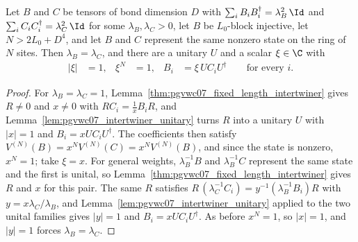 \begin{lemma}
    \label{lem:pgvwc07_ti_uniqueness_single_block}
    \leanok
    Let $B$ and $C$ be tensors of bond dimension $D$ with
    $\sum_iB_iB_i^\dagger=\lambda_B^2\,\Id$ and
    $\sum_iC_iC_i^\dagger=\lambda_C^2\,\Id$ for some $\lambda_B,\lambda_C>0$,
    let $B$ be $L_0$-block injective, let $N>2L_0+D^4$, and let $B$ and $C$
    represent the same nonzero state on the ring of $N$ sites. Then
    $\lambda_B=\lambda_C$, and there are a unitary $U$ and a scalar
    $\xi\in\C$ with
    \begin{align}
        |\xi| & =1, & \xi^N & =1, & B_i & =\xi\,UC_iU^\dagger
        \qquad\text{for every }i.
        \label{eq:pgvwc07_ti_uniqueness_conclusion}
    \end{align}
\end{lemma}

\begin{proof}
    \leanok
    For $\lambda_B=\lambda_C=1$,
    Lemma~\ref{thm:pgvwc07_fixed_length_intertwiner} gives $R\neq0$ and
    $x\neq0$ with $RC_i=\tfrac1xB_iR$, and
    Lemma~\ref{lem:pgvwc07_intertwiner_unitary} turns $R$ into a unitary $U$
    with $|x|=1$ and $B_i=xUC_iU^\dagger$. The coefficients then satisfy
    $V^{(N)}(B)=x^NV^{(N)}(C)=x^NV^{(N)}(B)$, and since the state is nonzero,
    $x^N=1$; take $\xi=x$. For general weights, $\lambda_B^{-1}B$ and
    $\lambda_B^{-1}C$ represent the same state and the first is unital, so
    Lemma~\ref{thm:pgvwc07_fixed_length_intertwiner} gives $R$ and $x$ for
    this pair. The same $R$ satisfies
    $R\,(\lambda_C^{-1}C_i)=y^{-1}(\lambda_B^{-1}B_i)R$ with
    $y=x\lambda_C/\lambda_B$, and
    Lemma~\ref{lem:pgvwc07_intertwiner_unitary} applied to the two unital
    families gives $|y|=1$ and $B_i=xUC_iU^\dagger$. As before $x^N=1$, so
    $|x|=1$, and $|y|=1$ forces $\lambda_B=\lambda_C$.
\end{proof}

